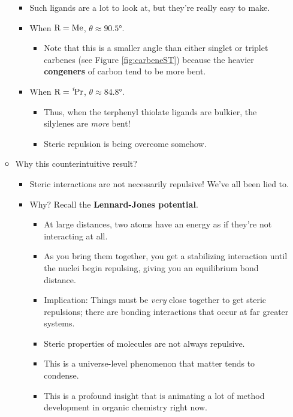 \documentclass[../notes.tex]{subfiles}
\begin{document}
\begin{itemize}
\begin{itemize}
        \begin{itemize}
            \item Such ligands are a lot to look at, but they're really easy to make.
            \item When $\ce{R}=\ce{Me}$, $\theta\approx\ang{90.5}$.
            \begin{itemize}
                \item Note that this is a smaller angle than either singlet or triplet carbenes (see Figure \ref{fig:carbeneST}) because the heavier \textbf{congeners} of carbon tend to be more bent.
            \end{itemize}
            \item When $\ce{R}=\ce{{}^{\emph{i}}Pr}$, $\theta\approx\ang{84.8}$.
            \begin{itemize}
                \item Thus, when the terphenyl thiolate ligands are bulkier, the silylenes are \emph{more} bent!
                \item Steric repulsion is being overcome somehow.
            \end{itemize}
        \end{itemize}
        \item Why this counterintuitive result?
        \begin{itemize}
            \item Steric interactions are not necessarily repulsive! We've all been lied to.
            \item Why? Recall the \textbf{Lennard-Jones potential}.
            \begin{itemize}
                \item At large distances, two atoms have an energy as if they're not interacting at all.
                \item As you bring them together, you get a stabilizing interaction until the nuclei begin repulsing, giving you an equilibrium bond distance.
                \item Implication: Things must be \emph{very} close together to get steric repulsions; there are bonding interactions that occur at far greater systems.
                \item Steric properties of molecules are not always repulsive.
                \item This is a universe-level phenomenon that matter tends to condense.
                \item This is a profound insight that is animating a lot of method development in organic chemistry right now.

\end{itemize}
\end{itemize}
\end{itemize}
\end{itemize}
\end{document}
